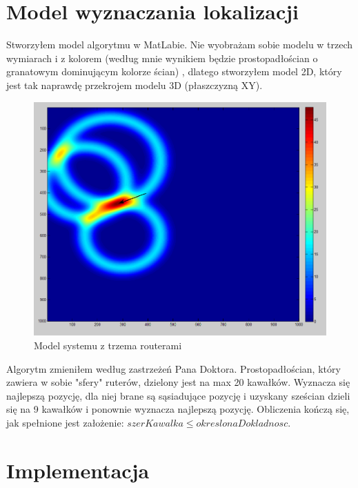 \documentclass{article}
\begin{document}
\section{Model wyznaczania lokalizacji}
	Stworzyłem model algorytmu w MatLabie. Nie wyobrażam sobie modelu w trzech wymiarach i z kolorem (według mnie wynikiem będzie prostopadłościan o granatowym dominującym kolorze ścian) , dlatego stworzyłem model 2D, który jest tak naprawdę przekrojem modelu 3D (płaszczyzną XY).
	\begin{figure}	
		\centering			
		\caption{Model systemu z trzema routerami}
		\includegraphics[width=\textwidth]{guasianRouter}
	\end{figure}
	Algorytm zmieniłem według zastrzeżeń Pana Doktora. Prostopadłościan, który zawiera w sobie "sfery" ruterów, dzielony jest na max 20 kawałków. Wyznacza się najlepszą pozycję, dla niej brane są sąsiadujące pozycję i uzyskany sześcian dzieli się na 9 kawałków i ponownie wyznacza najlepszą pozycję. Obliczenia kończą się, jak spełnione jest założenie: $szerKawalka \leqslant okreslonaDokladnosc$.
	
\section{Implementacja}
\end{document}
